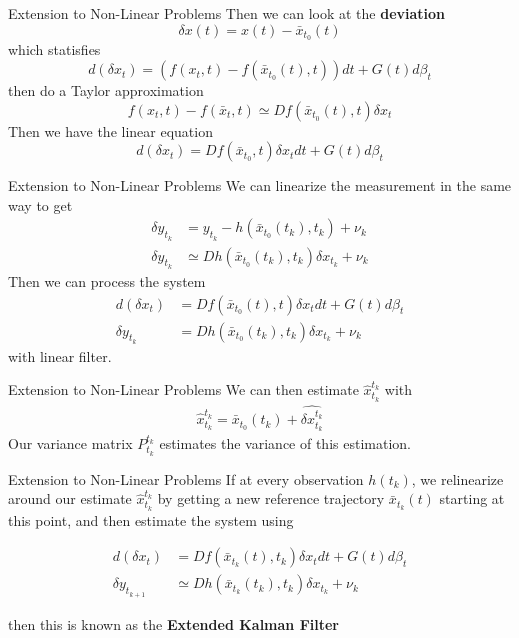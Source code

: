 \documentclass{beamer}
\begin{document}
\begin{frame}{Extension to Non-Linear Problems}
  Then we can look at the \textbf{deviation}
  \begin{equation}
    \delta x(t) = x(t) - \bar{x}_{t_0}(t) 
  \end{equation}
  which statisfies
  \pause
  \begin{equation}
    d(\delta x_t) = (f(x_t,t) - f(\bar{x}_{t_0}(t),t)) dt + G(t) d\beta_t
  \end{equation}
  \pause
  then do a Taylor approximation
  \begin{equation}
    f(x_t,t) - f(\bar{x}_t,t) \simeq Df(\bar{x}_{t_0}(t),t)  \delta x_t 
  \end{equation}
  \pause
  Then we have the linear equation
  \begin{equation}
    d(\delta x_t) = Df(\bar{x}_{t_0} , t) \delta x_t dt + G(t) d\beta_t
  \end{equation}
\end{frame}

\begin{frame}{Extension to Non-Linear Problems}
  We can linearize the measurement in the same way to get
  \begin{align}
    \delta y_{t_k} &= y_{t_k} - h(\bar{x}_{t_0}(t_k), t_k) + \nu_k \\
    \delta y_{t_k} &\simeq Dh(\bar{x}_{t_0}(t_k),t_k) \delta x_{t_k} + \nu_k
  \end{align}
  \pause
  Then we can process the system
  \begin{align}
    d(\delta x_t) &= Df(\bar{x}_{t_0}(t),t) \delta x_t dt + G(t) d\beta_t \\
    \delta y_{t_k} & = Dh(\bar{x}_{t_0}(t_k),t_k) \delta x_{t_k} + \nu_k
  \end{align}
  with  linear filter.
\end{frame}

\begin{frame}{Extension to Non-Linear Problems}
  We can then estimate $\hat{x}_{t_k}^{t_k}$ with
  \begin{align}
    \hat{x}_{t_k}^{t_k} = \bar{x}_{t_0}(t_k) + \hat{\delta x_{t_k}^{t_k}}
  \end{align}
  Our variance matrix $P_{t_k}^{t_k}$ estimates the variance of this
  estimation.
\end{frame}

\begin{frame}{Extension to Non-Linear Problems}
  If at every observation $h(t_k)$, we relinearize around our estimate
  $\hat{x}_{t_k}^{t_k}$ by getting a new reference trajectory $\bar{x}_{t_k}(t)$
  starting at this point, and then estimate the system using

  
  \begin{align}
    d(\delta x_t) &= Df(\bar{x}_{t_k}(t),t_k) \delta x_t dt + G(t) d\beta_t \\
    \delta y_{t_{k+1}} &\simeq Dh(\bar{x}_{t_k}(t_k),t_k) \delta x_{t_k} + \nu_k
  \end{align}

  then this is known as the \textbf{Extended Kalman Filter}
\end{frame}
\end{document}
